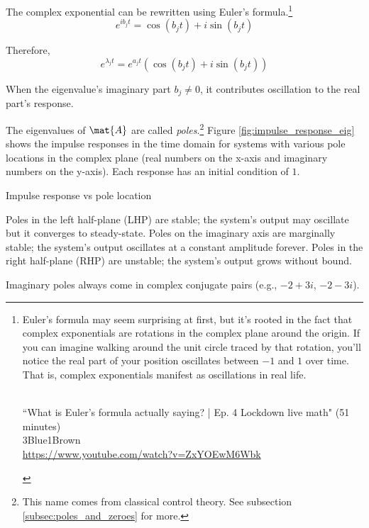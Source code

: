 The complex exponential can be rewritten using Euler's formula.\footnote{Euler's
formula may seem surprising at first, but it's rooted in the fact that complex
exponentials are rotations in the complex plane around the origin. If you can
imagine walking around the unit circle traced by that rotation, you'll notice
the real part of your position oscillates between $-1$ and $1$ over time. That
is, complex exponentials manifest as oscillations in real life.
\begin{center}
   \\
  ``What is Euler's formula actually saying? | Ep. 4 Lockdown live math" (51
    minutes) \\
  \footnotesize 3Blue1Brown \\
  \url{https://www.youtube.com/watch?v=ZxYOEwM6Wbk}
\end{center}
}
\begin{equation*}
  e^{i b_j t} = \cos(b_j t) + i \sin(b_j t)
\end{equation*}

Therefore,
\begin{equation*}
  e^{\lambda_j t} = e^{a_j t} (\cos(b_j t) + i \sin(b_j t))
\end{equation*}

When the eigenvalue's imaginary part $b_j \neq 0$, it contributes oscillation to
the real part's response.

The eigenvalues of $\mat{A}$ are called \textit{poles}.\footnote{This name comes
from classical control theory. See subsection \ref{subsec:poles_and_zeroes} for
more.} Figure \ref{fig:impulse_response_eig} shows the \glspl{impulse response}
in the time domain for \glspl{system} with various pole locations in the complex
plane (real numbers on the x-axis and imaginary numbers on the y-axis). Each
response has an initial condition of $1$.
\begin{bookfigure}
  
  \caption{Impulse response vs pole location}
  \label{fig:impulse_response_eig}
\end{bookfigure}

Poles in the left half-plane (LHP) are stable; the \gls{system}'s output may
oscillate but it converges to steady-state. Poles on the imaginary axis are
marginally stable; the \gls{system}'s output oscillates at a constant amplitude
forever. Poles in the right half-plane (RHP) are unstable; the \gls{system}'s
output grows without bound.
\begin{remark}
  Imaginary poles always come in complex conjugate pairs (e.g., $-2 + 3i$,
  $-2 - 3i$).
\end{remark}
